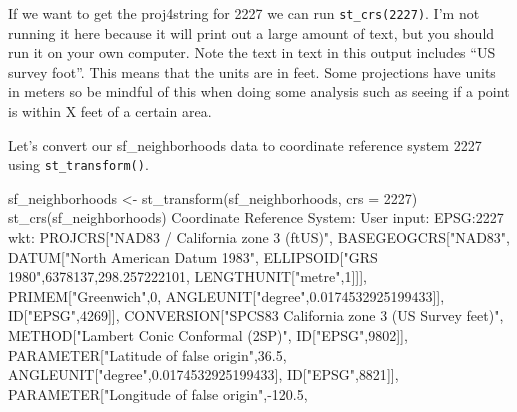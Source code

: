 \documentclass[
]{krantz}
\makeatletter
\newenvironment{Shaded}{\begin{snugshade}}{\end{snugshade}}
\newcommand{\AttributeTok}[1]{\textcolor[rgb]{0.61,0.61,0.61}{#1}}
\newcommand{\DecValTok}[1]{\textcolor[rgb]{0.06,0.06,0.06}{#1}}
\newcommand{\FloatTok}[1]{\textcolor[rgb]{0.06,0.06,0.06}{#1}}
\newcommand{\FunctionTok}[1]{\textcolor[rgb]{0,0,0}{#1}}
\newcommand{\NormalTok}[1]{#1}
\newcommand{\OtherTok}[1]{\textcolor[rgb]{0.37,0.37,0.37}{#1}}
\newcommand{\SpecialCharTok}[1]{\textcolor[rgb]{0,0,0}{#1}}
\newcommand{\StringTok}[1]{\textcolor[rgb]{0.5,0.5,0.5}{#1}}
\newenvironment{kframe}{%
\medskip{}
\setlength{\fboxsep}{.8em}
 \def\at@end@of@kframe{}%
 \ifinner\ifhmode%
  \def\at@end@of@kframe{\end{minipage}}%
  \begin{minipage}{\columnwidth}%
 \fi\fi%
 \def\FrameCommand##1{\hskip\@totalleftmargin \hskip-\fboxsep
 \colorbox{shadecolor}{##1}\hskip-\fboxsep
     \hskip-\linewidth \hskip-\@totalleftmargin \hskip\columnwidth}%
 \MakeFramed {\advance\hsize-\width
   \@totalleftmargin\z@ \linewidth\hsize
   \@setminipage}}%
 {\par\unskip\endMakeFramed%
 \at@end@of@kframe}
\renewenvironment{Shaded}{\begin{kframe}}{\end{kframe}}
\makeatother
\begin{document}
If we want to get the proj4string for 2227 we can run
\texttt{st\_crs(2227)}. I'm not running it here because it
will print out a large amount of text, but you should run it
on your own computer. Note the text in text in this output
includes ``US survey foot''. This means that the units are
in feet. Some projections have units in meters so be mindful
of this when doing some analysis such as seeing if a point
is within X feet of a certain area.

Let's convert our sf\_neighborhoods data to coordinate
reference system 2227 using \texttt{st\_transform()}.

\begin{Shaded}
\begin{Highlighting}[]
\NormalTok{sf\_neighborhoods }\OtherTok{\textless{}{-}} \FunctionTok{st\_transform}\NormalTok{(sf\_neighborhoods, }\AttributeTok{crs =} \DecValTok{2227}\NormalTok{)}
\FunctionTok{st\_crs}\NormalTok{(sf\_neighborhoods)}
\NormalTok{Coordinate Reference System}\SpecialCharTok{:}
\NormalTok{  User input}\SpecialCharTok{:}\NormalTok{ EPSG}\SpecialCharTok{:}\DecValTok{2227} 
\NormalTok{  wkt}\SpecialCharTok{:}
\NormalTok{PROJCRS[}\StringTok{"NAD83 / California zone 3 (ftUS)"}\NormalTok{,}
\NormalTok{    BASEGEOGCRS[}\StringTok{"NAD83"}\NormalTok{,}
\NormalTok{        DATUM[}\StringTok{"North American Datum 1983"}\NormalTok{,}
\NormalTok{            ELLIPSOID[}\StringTok{"GRS 1980"}\NormalTok{,}\DecValTok{6378137}\NormalTok{,}\FloatTok{298.257222101}\NormalTok{,}
\NormalTok{                LENGTHUNIT[}\StringTok{"metre"}\NormalTok{,}\DecValTok{1}\NormalTok{]]],}
\NormalTok{        PRIMEM[}\StringTok{"Greenwich"}\NormalTok{,}\DecValTok{0}\NormalTok{,}
\NormalTok{            ANGLEUNIT[}\StringTok{"degree"}\NormalTok{,}\FloatTok{0.0174532925199433}\NormalTok{]],}
\NormalTok{        ID[}\StringTok{"EPSG"}\NormalTok{,}\DecValTok{4269}\NormalTok{]],}
\NormalTok{    CONVERSION[}\StringTok{"SPCS83 California zone 3 (US Survey feet)"}\NormalTok{,}
\NormalTok{        METHOD[}\StringTok{"Lambert Conic Conformal (2SP)"}\NormalTok{,}
\NormalTok{            ID[}\StringTok{"EPSG"}\NormalTok{,}\DecValTok{9802}\NormalTok{]],}
\NormalTok{        PARAMETER[}\StringTok{"Latitude of false origin"}\NormalTok{,}\FloatTok{36.5}\NormalTok{,}
\NormalTok{            ANGLEUNIT[}\StringTok{"degree"}\NormalTok{,}\FloatTok{0.0174532925199433}\NormalTok{],}
\NormalTok{            ID[}\StringTok{"EPSG"}\NormalTok{,}\DecValTok{8821}\NormalTok{]],}
\NormalTok{        PARAMETER[}\StringTok{"Longitude of false origin"}\NormalTok{,}\SpecialCharTok{{-}}\FloatTok{120.5}\NormalTok{,}

\end{Highlighting}
\end{Shaded}
\end{document}
